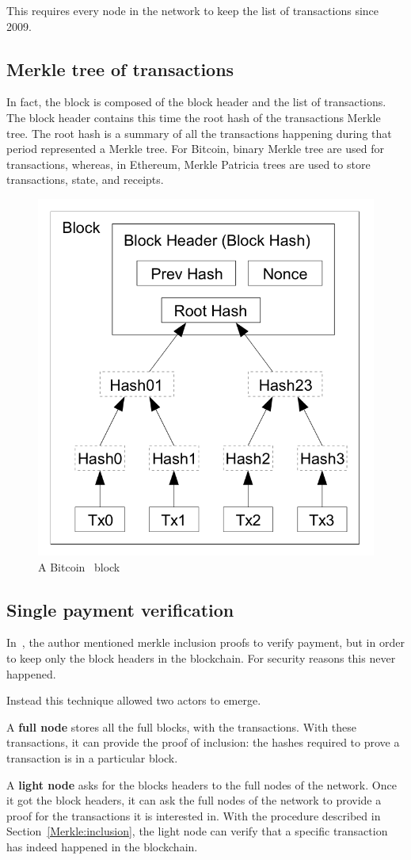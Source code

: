This requires every node in the network to keep the list of transactions since 2009.

\subsection{Merkle tree of transactions}
In fact, the block is composed of the block header and the list of transactions. The block header contains this time the root hash of the transactions Merkle tree.
The root hash is a summary of all the transactions happening during that period represented a Merkle tree. For Bitcoin, binary Merkle tree are used for transactions, whereas, in Ethereum, Merkle Patricia trees are used to store transactions, state, and receipts. 
\begin{figure}[H]
    \centering
\includegraphics[width=0.4\linewidth]{background/blockMerkle.png}
    \caption{A Bitcoin~\cite{Nakamoto..09} block}
    \label{fig:blockMerkle}
\end{figure}

\subsection{Single payment verification}

In~\cite{Nakamoto..09}, the author mentioned merkle inclusion proofs to verify payment, but in order to keep only the block headers in the blockchain. For security reasons this never happened. 

Instead this technique allowed two actors to emerge.

A \textbf{full node} stores all the full blocks, with the transactions. With these transactions, it can provide the proof of inclusion: the hashes required to prove a transaction is in a particular block.

A \textbf{light node} asks for the blocks headers to the full nodes of the network. Once it got the block headers, it can ask the full nodes of the network to provide a proof for the transactions it is interested in. With the procedure described in Section~\ref{Merkle:inclusion}, the light node can verify that a specific transaction has indeed happened in the blockchain.

